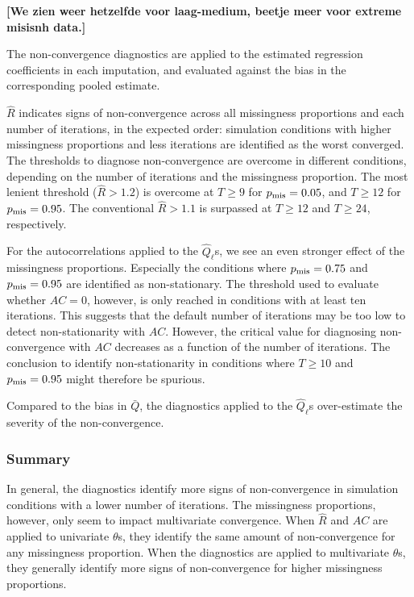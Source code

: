 \documentclass[Royal,times,sageh]{sagej}
\begin{document}
\textbf{{[}We zien weer hetzelfde voor laag-medium, beetje meer voor extreme misisnh data.{]}}

The non-convergence diagnostics are applied to the estimated regression coefficients in each imputation, and evaluated against the bias in the corresponding pooled estimate.

\(\widehat{R}\) indicates signs of non-convergence across all missingness proportions and each number of iterations, in the expected order: simulation conditions with higher missingness proportions and less iterations are identified as the worst converged. The thresholds to diagnose non-convergence are overcome in different conditions, depending on the number of iterations and the missingness proportion. The most lenient threshold (\(\widehat{R}>1.2\)) is overcome at \(T\geq9\) for \(p_{\rm mis} = 0.05\), and \(T\geq12\) for \(p_{\rm mis} = 0.95\). The conventional \(\widehat{R}>1.1\) is surpassed at \(T\geq12\) and \(T\geq24\), respectively.

For the autocorrelations applied to the \(\hat{Q}_\ell\)s, we see an even stronger effect of the missingness proportions. Especially the conditions where \(p_{\rm mis} = 0.75\) and \(p_{\rm mis} = 0.95\) are identified as non-stationary. The threshold used to evaluate whether \(AC=0\), however, is only reached in conditions with at least ten iterations. This suggests that the default number of iterations may be too low to detect non-stationarity with \(AC\). However, the critical value for diagnosing non-convergence with \(AC\) decreases as a function of the number of iterations. The conclusion to identify non-stationarity in conditions where \(T\geq10\) and \(p_{\rm mis} = 0.95\) might therefore be spurious.

Compared to the bias in \(\bar{Q}\), the diagnostics applied to the \(\hat{Q}_\ell\)s over-estimate the severity of the non-convergence.

\hypertarget{summary-1}{%
\subsubsection{Summary}\label{summary-1}}

In general, the diagnostics identify more signs of non-convergence in simulation conditions with a lower number of iterations. The missingness proportions, however, only seem to impact multivariate convergence. When \(\widehat{R}\) and \(AC\) are applied to univariate \(\theta\)s, they identify the same amount of non-convergence for any missingness proportion. When the diagnostics are applied to multivariate \(\theta\)s, they generally identify more signs of non-convergence for higher missingness proportions.
\end{document}
